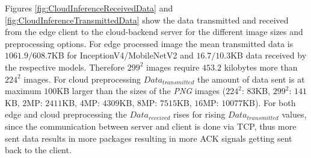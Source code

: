 Figures \ref{fig:CloudInferenceReceivedData} and \ref{fig:CloudInferenceTransmittedData} show the data transmitted and received from the edge client to the cloud-backend server for the different image sizes and preprocessing options.
For edge processed image the mean transmitted data is $1061.9/608.7$KB for InceptionV4/MobileNetV2 and $16.7/10.3$KB data received by the respective models.
Therefore $299^2$ images require $453.2$ kilobytes more than $224^2$ images.
For cloud preprocessing $Data_{transmitted}$ the amount of data sent is at maximum $100$KB larger than the sizes of the \emph{PNG} images ($224^2$: $83$KB, $299^2$: $141$KB, $2$MP: $2411$KB, $4$MP: $4309$KB, $8$MP: $7515$KB,  $16$MP: $10077$KB).
For both edge and cloud preprocessing the $Data_{received}$ rises for rising $Data_{transmitted}$ values, since the communication between server and client is done via TCP, thus more sent data results in more packages resulting in more ACK signals getting sent back to the client.


